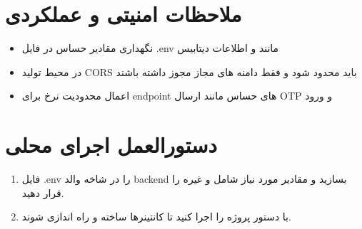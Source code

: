 \section{ملاحظات امنیتی و عملکردی}
\begin{itemize}
  \item نگهداری مقادیر حساس در فایل .env مانند  و اطلاعات دیتابیس
  \item در محیط تولید CORS باید محدود شود و فقط دامنه های مجاز مجوز داشته باشند
  \item اعمال محدودیت نرخ برای endpoint های حساس مانند ارسال OTP و ورود
\end{itemize}

\section{دستورالعمل اجرای محلی}
\begin{enumerate}
  \item فایل .env را در شاخه والد backend بسازید و مقادیر مورد نیاز شامل  و غیره را قرار دهید.
  \item با دستور  پروژه را اجرا کنید تا کانتینرها ساخته و راه اندازی شوند.
\end{enumerate}
